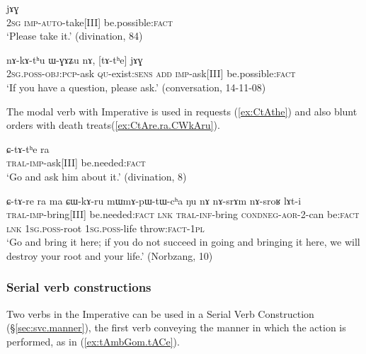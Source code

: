 \begin{exe}
\ex  \label{ex:tAnWndAm.jAG}
 jɤɣ \\
\textsc{2sg} \textsc{imp}-\textsc{auto}-take[III] be.possible:\textsc{fact} \\
\glt `Please take it.' (divination, 84)
\end{exe}

\begin{exe}
\ex  \label{ex:tAthe.jAG}
\gll nɤ-kɤ-tʰu ɯ-ɣɤʑu nɤ, [tɤ-tʰe] jɤɣ \\
\textsc{2sg}.\textsc{poss}-\textsc{obj}:\textsc{pcp}-ask \textsc{qu}-exist:\textsc{sens} \textsc{add} \textsc{imp}-ask[III] be.possible:\textsc{fact} \\
\glt `If you have a question, please ask.' (conversation, 14-11-08)
\end{exe}

The modal verb  with Imperative is used in requests (\ref{ex:CtAthe}) and also blunt orders with death treats(\ref{ex:CtAre.ra.CWkAru}).

\begin{exe}
\ex \label{ex:CtAthe} 
\gll ɕ-tɤ-tʰe ra \\
\textsc{tral}-\textsc{imp}-ask[III] be.needed:\textsc{fact} \\
\glt `Go and ask him about it.' (divination, 8)
\end{exe}

\begin{exe}
\ex \label{ex:CtAre.ra.CWkAru}
\gll  ɕ-tɤ-re ra ma ɕɯ-kɤ-ru mɯ\redp{}mɤ-pɯ-tɯ-cʰa ŋu nɤ nɤ-srɤm nɤ-sroʁ lɤt-i \\
\textsc{tral}-\textsc{imp}-bring[III] be.needed:\textsc{fact} \textsc{lnk} \textsc{tral}-\textsc{inf}-bring \textsc{cond}\redp{}\textsc{neg}-\textsc{aor}-2-can be:\textsc{fact} \textsc{lnk} \textsc{1sg}.\textsc{poss}-root \textsc{1sg}.\textsc{poss}-life throw:\textsc{fact}-\textsc{1pl} \\ 
\glt `Go and bring it here; if you do not succeed in going and bringing it here, we will destroy your root and your life.' (Norbzang, 10)
\end{exe}


\subsubsection{Serial verb constructions} \label{sec:imp.SVC}
Two verbs in the Imperative can be used in a Serial Verb Construction (§\ref{sec:svc.manner}), the first verb conveying the manner in which the action is performed, as in (\ref{ex:tAmbGom.tACe}).

